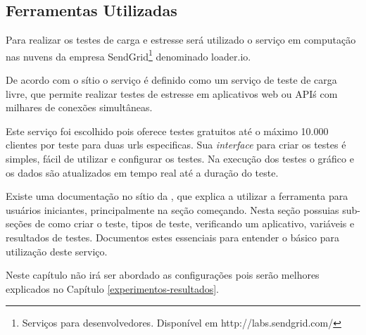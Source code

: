 





\subsection{Ferramentas Utilizadas}
\label{ferramentas-utilizadas-para-testes}
  
  Para realizar os testes de carga e estresse será utilizado o serviço em computação nas nuvens
  da empresa SendGrid\footnote{Serviços para desenvolvedores. Disponível em http://labs.sendgrid.com/} denominado loader.io.
  
  De acordo com o sítio o serviço é definido como um serviço de teste de carga livre,
  que permite realizar testes de estresse em aplicativos web ou API\'s com milhares de conexões simultâneas.
  
  Este serviço foi escolhido pois oferece testes gratuitos até o máximo 10.000 clientes por teste para duas 
  urls especificas. Sua \textit{interface} para criar os testes é simples, fácil de utilizar e
  configurar os testes. Na execução dos testes o gráfico e os dados são atualizados em tempo real até a duração do teste.
  
  Existe uma documentação no sítio da , que explica a utilizar a ferramenta para usuários
  iniciantes, principalmente na seção começando. Nesta seção possuias sub-seções de como criar o teste, tipos de teste,
  verificando um aplicativo, variáveis e resultados de testes. Documentos estes essenciais para 
  entender o básico para utilização deste serviço. 
  
  Neste capítulo não irá ser abordado as configurações pois serão melhores explicados
  no Capítulo \ref{experimentos-resultados}.
